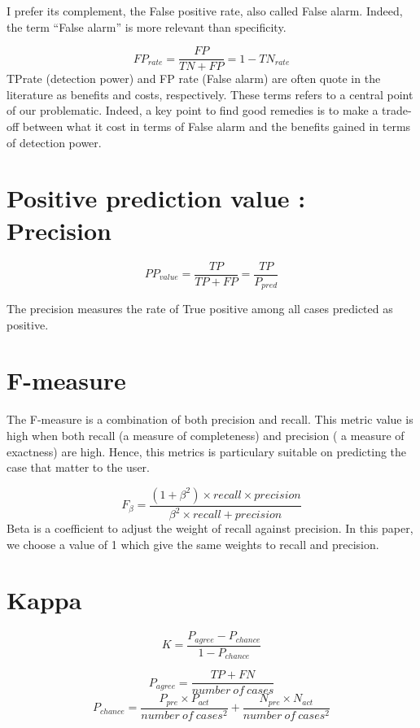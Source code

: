 \documentclass[
]{report}
\begin{document}
I prefer its complement, the False positive rate, also called False alarm. Indeed, the term ``False alarm'' is more relevant than specificity.

\[FP_{rate} = \frac{FP}{TN+FP} = 1 - TN_{rate}\]
TPrate (detection power) and FP rate (False alarm) are often quote in the literature as benefits and costs, respectively. These terms refers to a central point of our problematic. Indeed, a key point to find good remedies is to make a trade-off between what it cost in terms of False alarm and the benefits gained in terms of detection power.

\hypertarget{positive-prediction-value-precision}{%
\section{Positive prediction value : Precision}\label{positive-prediction-value-precision}}

\[PP_{value} = \frac{TP}{TP+FP} =  \frac{TP}{P_{pred}} \]

The precision measures the rate of True positive among all cases predicted as positive.

\hypertarget{f-measure}{%
\section{F-measure}\label{f-measure}}

The F-measure is a combination of both precision and recall. This metric value is high when both recall (a measure of completeness) and precision ( a measure of exactness) are high. Hence, this metrics is particulary suitable on predicting the case that matter to the user.

\[F_\beta = \frac{(1+\beta^2) \times recall \times precision}{\beta^2 \times recall + precision}\]
Beta is a coefficient to adjust the weight of recall against precision. In this paper, we choose a value of 1 which give the same weights to recall and precision.

\hypertarget{kappa}{%
\section{Kappa}\label{kappa}}

\[K = \frac{P_{agree}-P_{chance}}{1-P_{chance}}\]

\[P_{agree} = \frac{TP + FN} {number \ of \ cases} \]
\[P_{chance} = \frac{P_{pre} \times P_{act}}{number \ of \ cases^2}+\frac{N_{pre} \times N_{act}}{number \ of \ cases^2}\]
\end{document}
